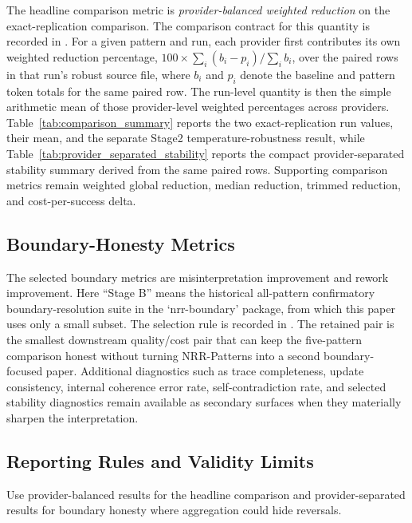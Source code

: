 \documentclass[11pt,a4paper]{article}
\begin{document}
The headline comparison metric is \emph{provider-balanced weighted reduction}
on the exact-replication comparison. The comparison contract for this quantity
is recorded in .
For a given pattern and run, each provider first contributes its own weighted
reduction percentage, \(100 \times \sum_i (b_i - p_i) / \sum_i b_i\), over the
paired rows in that run's robust source file, where \(b_i\) and \(p_i\) denote
the baseline and pattern token totals for the same paired row. The run-level
quantity  is then the simple
arithmetic mean of those provider-level weighted percentages across providers.
Table~\ref{tab:comparison_summary} reports the two exact-replication run
values, their mean, and the separate Stage2 temperature-robustness result,
while Table~\ref{tab:provider_separated_stability} reports the compact
provider-separated stability summary derived from the same paired rows.
Supporting comparison metrics remain weighted global reduction, median
reduction, trimmed reduction, and cost-per-success delta.

\subsection{Boundary-Honesty Metrics}

The selected boundary metrics are misinterpretation improvement and rework
improvement. Here ``Stage B'' means the historical all-pattern confirmatory
boundary-resolution suite in the `nrr-boundary' package, from which this paper
uses only a small subset. The selection rule is recorded in
. The
retained pair is the smallest downstream quality/cost pair that can keep the
five-pattern comparison honest without turning NRR-Patterns into a second
boundary-focused paper. Additional diagnostics such as trace completeness,
update consistency, internal coherence error rate, self-contradiction rate,
and selected stability diagnostics remain available as secondary surfaces when
they materially sharpen the interpretation.

\subsection{Reporting Rules and Validity Limits}

Use provider-balanced results for the headline comparison and provider-separated results for boundary honesty where aggregation could hide reversals.
\end{document}

